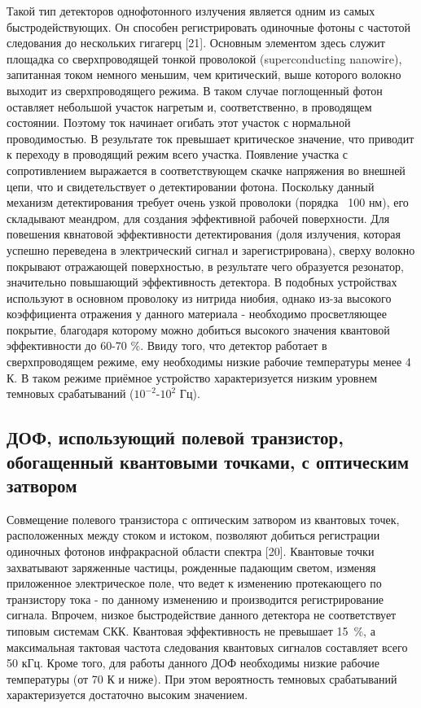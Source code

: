 Такой тип детекторов однофотонного излучения является одним из самых быстродействующих. Он способен регистрировать одиночные фотоны с частотой следования до нескольких гигагерц [21]. Основным элементом здесь служит площадка со сверхпроводящей тонкой проволокой (superconducting nanowire), запитанная током немного меньшим, чем критический, выше которого волокно выходит из сверхпроводящего режима. В таком случае поглощенный фотон оставляет небольшой участок нагретым и, соответственно, в проводящем состоянии. Поэтому ток начинает огибать этот участок с нормальной проводимостью. В результате ток превышает критическое значение, что приводит к переходу в проводящий режим всего участка. Появление участка с сопротивлением выражается в соответствующем скачке напряжения во внешней цепи, что и свидетельствует о детектировании фотона. Поскольку данный механизм детектирования требует очень узкой проволоки (порядка ~100 нм), его складывают меандром, для создания эффективной рабочей поверхности. Для повешения квнатовой эффективности детектирования (доля излучения, которая успешно переведена в электрический сигнал и зарегистрирована), сверху волокно покрывают отражающей поверхностью, в результате чего образуется резонатор, значительно повышающий эффективность детектора. В подобных устройствах используют в основном проволоку из нитрида ниобия, однако из-за высокого коэффициента отражения у данного материала - необходимо просветляющее покрытие, благодаря которому можно добиться высокого значения квантовой эффективности до 60-70 \%. Ввиду того, что детектор работает в сверхпроводящем режиме, ему необходимы низкие рабочие температуры менее 4 К. В таком режиме приёмное устройство характеризуется низким уровнем темновых срабатываний ($10^{-2}$-$10^2$ Гц).

\subsection{ДОФ, использующий полевой транзистор, обогащенный квантовыми точками, с оптическим затвором} \label{subsec:ch1/sec5/sub2}

Совмещение полевого транзистора с оптическим затвором из квантовых точек, расположенных между стоком и истоком, позволяют добиться регистрации одиночных фотонов инфракрасной области спектра [20]. Квантовые точки захватывают заряженные частицы, рожденные падающим светом, изменяя приложенное электрическое поле, что ведет к изменению протекающего по транзистору тока - по данному изменению и производится регистрирование сигнала. Впрочем, низкое быстродействие данного детектора не соответствует типовым системам СКК. Квантовая эффективность не превышает 15~\%, а максимальная тактовая частота следования квантовых сигналов составляет всего 50 кГц. Кроме того, для работы данного ДОФ необходимы низкие рабочие температуры (от 70 К и ниже). При этом вероятность темновых срабатываний характеризуется достаточно высоким значением.

